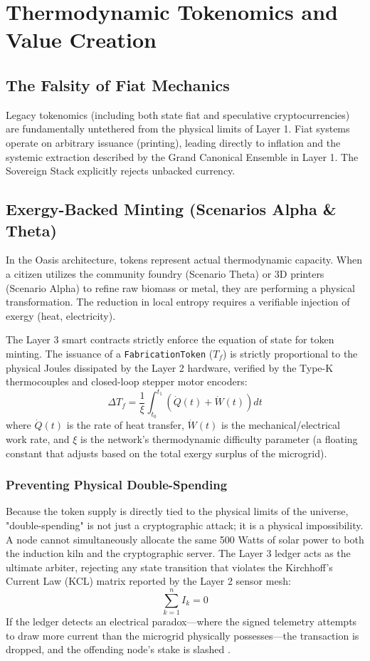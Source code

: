 \chapter{Thermodynamic Tokenomics and Value Creation}

\section{The Falsity of Fiat Mechanics}
Legacy tokenomics (including both state fiat and speculative cryptocurrencies) are fundamentally untethered from the physical limits of Layer 1. Fiat systems operate on arbitrary issuance (printing), leading directly to inflation and the systemic extraction described by the Grand Canonical Ensemble in Layer 1. The Sovereign Stack explicitly rejects unbacked currency.

\section{Exergy-Backed Minting (Scenarios Alpha \& Theta)}
In the Oasis architecture, tokens represent actual thermodynamic capacity. When a citizen utilizes the community foundry (Scenario Theta) or 3D printers (Scenario Alpha) to refine raw biomass or metal, they are performing a physical transformation. The reduction in local entropy requires a verifiable injection of exergy (heat, electricity).

The Layer 3 smart contracts strictly enforce the equation of state for token minting. The issuance of a \texttt{FabricationToken} ($T_f$) is strictly proportional to the physical Joules dissipated by the Layer 2 hardware, verified by the Type-K thermocouples and closed-loop stepper motor encoders:
\begin{equation}
\Delta T_f = \frac{1}{\xi} \int_{t_0}^{t_1} \left( \dot{Q}(t) + \dot{W}(t) \right) dt
\end{equation}
where $\dot{Q}(t)$ is the rate of heat transfer, $\dot{W}(t)$ is the mechanical/electrical work rate, and $\xi$ is the network's thermodynamic difficulty parameter (a floating constant that adjusts based on the total exergy surplus of the microgrid). 

\subsection{Preventing Physical Double-Spending}
Because the token supply is directly tied to the physical limits of the universe, "double-spending" is not just a cryptographic attack; it is a physical impossibility. A node cannot simultaneously allocate the same 500 Watts of solar power to both the induction kiln and the cryptographic server. The Layer 3 ledger acts as the ultimate arbiter, rejecting any state transition that violates the Kirchhoff's Current Law (KCL) matrix reported by the Layer 2 sensor mesh:
\begin{equation}
\sum_{k=1}^{n} I_k = 0
\end{equation}
If the ledger detects an electrical paradox—where the signed telemetry attempts to draw more current than the microgrid physically possesses—the transaction is dropped, and the offending node's stake is slashed \cite{kondepudi2014modern}.

